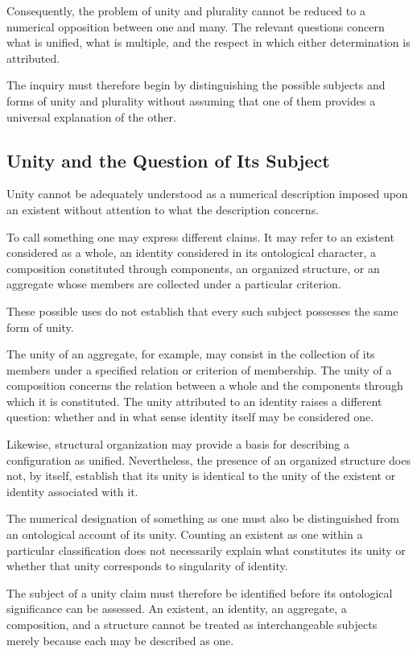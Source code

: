 Consequently, the problem of unity and plurality
cannot be reduced to a numerical opposition between
one and many. The relevant questions concern what
is unified, what is multiple, and the respect in which
either determination is attributed.

The inquiry must therefore begin by distinguishing
the possible subjects and forms of unity and plurality
without assuming that one of them provides a universal
explanation of the other.

\subsection{Unity and the Question of Its Subject}

Unity cannot be adequately understood as a numerical
description imposed upon an existent without attention
to what the description concerns.

To call something one may express different claims.
It may refer to an existent considered as a whole,
an identity considered in its ontological character,
a composition constituted through components, an
organized structure, or an aggregate whose members
are collected under a particular criterion.

These possible uses do not establish that every
such subject possesses the same form of unity.

The unity of an aggregate, for example, may consist
in the collection of its members under a specified
relation or criterion of membership. The unity of
a composition concerns the relation between a whole
and the components through which it is constituted.
The unity attributed to an identity raises a different
question: whether and in what sense identity itself
may be considered one.

Likewise, structural organization may provide a
basis for describing a configuration as unified.
Nevertheless, the presence of an organized structure
does not, by itself, establish that its unity is
identical to the unity of the existent or identity
associated with it.

The numerical designation of something as one
must also be distinguished from an ontological
account of its unity. Counting an existent as one
within a particular classification does not
necessarily explain what constitutes its unity
or whether that unity corresponds to singularity
of identity.

The subject of a unity claim must therefore be
identified before its ontological significance
can be assessed. An existent, an identity, an
aggregate, a composition, and a structure cannot
be treated as interchangeable subjects merely
because each may be described as one.


